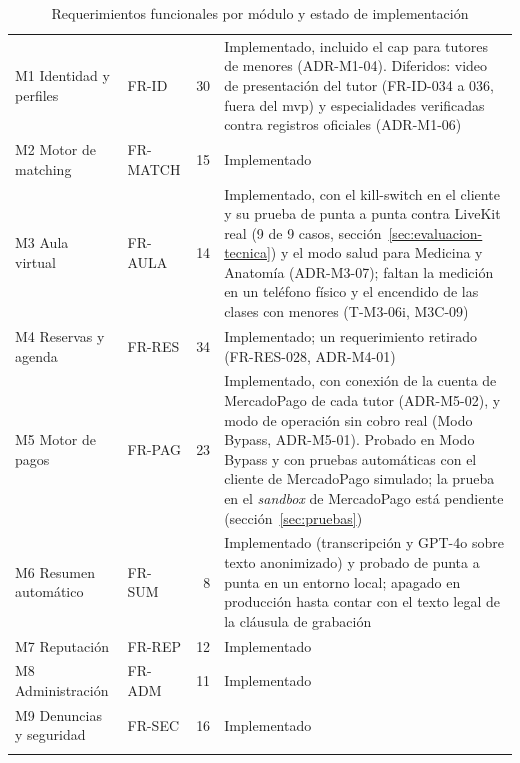 \begin{table}[H]
    \centering
    \caption{Requerimientos funcionales por módulo y estado de implementación}
    \label{tab:rf}
    \small
    \begin{tabularx}{\textwidth}{l l r L}
        \toprule
         &  &  &  \\
        \midrule
        M1 Identidad y perfiles    & FR-ID    & 30 & Implementado, incluido el \gls{cap} para tutores de menores (ADR-M1-04). Diferidos: video de presentación del tutor (FR-ID-034 a 036, fuera del \gls{mvp}) y especialidades verificadas contra registros oficiales (ADR-M1-06) \\
        M2 Motor de \gls{matching} & FR-MATCH & 15 & Implementado \\
        M3 Aula virtual            & FR-AULA  & 14 & Implementado, con el kill-switch en el cliente y su prueba de punta a punta contra LiveKit real (9 de 9 casos, sección~\ref{sec:evaluacion-tecnica}) y el modo salud para Medicina y Anatomía (ADR-M3-07); faltan la medición en un teléfono físico y el encendido de las clases con menores (T-M3-06i, M3C-09) \\
        M4 Reservas y agenda       & FR-RES   & 34 & Implementado; un requerimiento retirado (FR-RES-028, ADR-M4-01) \\
        M5 Motor de pagos          & FR-PAG   & 23 & Implementado, con conexión de la cuenta de MercadoPago de cada tutor (ADR-M5-02), y modo de operación sin cobro real (Modo Bypass, ADR-M5-01). Probado en Modo Bypass y con pruebas automáticas con el cliente de MercadoPago simulado; la prueba en el \emph{sandbox} de MercadoPago está pendiente (sección~\ref{sec:pruebas}) \\
        M6 Resumen automático      & FR-SUM   & 8  & Implementado (transcripción y GPT-4o sobre texto anonimizado) y probado de punta a punta en un entorno local; apagado en producción hasta contar con el texto legal de la cláusula de grabación \\
        M7 Reputación              & FR-REP   & 12 & Implementado \\
        M8 Administración          & FR-ADM   & 11 & Implementado \\
        M9 Denuncias y seguridad   & FR-SEC   & 16 & Implementado \\
        \midrule
         &  & \\
        \bottomrule
    \end{tabularx}
\end{table}

